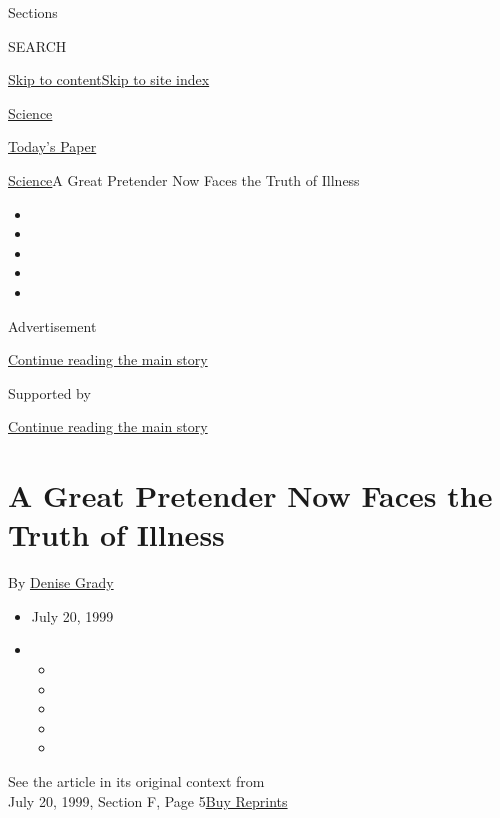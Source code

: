 Sections

SEARCH

\protect\hyperlink{site-content}{Skip to
content}\protect\hyperlink{site-index}{Skip to site index}

\href{https://www.nytimes.com/section/science}{Science}

\href{https://myaccount.nytimes.com/auth/login?response_type=cookie\&client_id=vi}{}

\href{https://www.nytimes.com/section/todayspaper}{Today's Paper}

\href{/section/science}{Science}\textbar{}A Great Pretender Now Faces
the Truth of Illness

\begin{itemize}
\item
\item
\item
\item
\item
\end{itemize}

Advertisement

\protect\hyperlink{after-top}{Continue reading the main story}

Supported by

\protect\hyperlink{after-sponsor}{Continue reading the main story}

\hypertarget{a-great-pretender-now-faces-the-truth-of-illness}{%
\section{A Great Pretender Now Faces the Truth of
Illness}\label{a-great-pretender-now-faces-the-truth-of-illness}}

By \href{https://www.nytimes.com/by/denise-grady}{Denise Grady}

\begin{itemize}
\item
  July 20, 1999
\item
  \begin{itemize}
  \item
  \item
  \item
  \item
  \item
  \end{itemize}
\end{itemize}

See the article in its original context from\\
July 20, 1999, Section F, Page
5\href{https://store.nytimes.com/collections/new-york-times-page-reprints?utm_source=nytimes\&utm_medium=article-page\&utm_campaign=reprints}{Buy
Reprints}

